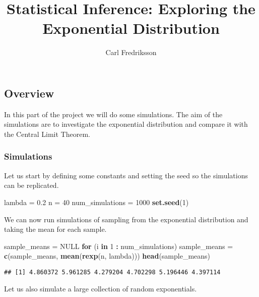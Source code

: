 \documentclass[]{article}
\title{Statistical Inference: Exploring the Exponential Distribution}
\author{Carl Fredriksson}
\date{}
\newenvironment{Shaded}{\begin{snugshade}}{\end{snugshade}}
\newcommand{\KeywordTok}[1]{\textcolor[rgb]{0.13,0.29,0.53}{\textbf{#1}}}
\newcommand{\DecValTok}[1]{\textcolor[rgb]{0.00,0.00,0.81}{#1}}
\newcommand{\FloatTok}[1]{\textcolor[rgb]{0.00,0.00,0.81}{#1}}
\newcommand{\StringTok}[1]{\textcolor[rgb]{0.31,0.60,0.02}{#1}}
\newcommand{\OtherTok}[1]{\textcolor[rgb]{0.56,0.35,0.01}{#1}}
\newcommand{\ControlFlowTok}[1]{\textcolor[rgb]{0.13,0.29,0.53}{\textbf{#1}}}
\newcommand{\OperatorTok}[1]{\textcolor[rgb]{0.81,0.36,0.00}{\textbf{#1}}}
\newcommand{\NormalTok}[1]{#1}
\begin{document}
\maketitle

\subsection{Overview}\label{overview}

In this part of the project we will do some simulations. The aim of the
simulations are to investigate the exponential distribution and compare
it with the Central Limit Theorem.

\subsubsection{Simulations}\label{simulations}

Let us start by defining some constants and setting the seed so the
simulations can be replicated.

\begin{Shaded}
\begin{Highlighting}[]
\NormalTok{lambda =}\StringTok{ }\FloatTok{0.2}
\NormalTok{n =}\StringTok{ }\DecValTok{40}
\NormalTok{num_simulations =}\StringTok{ }\DecValTok{1000}
\KeywordTok{set.seed}\NormalTok{(}\DecValTok{1}\NormalTok{)}
\end{Highlighting}
\end{Shaded}

We can now run simulations of sampling from the exponential distribution
and taking the mean for each sample.

\begin{Shaded}
\begin{Highlighting}[]
\NormalTok{sample_means =}\StringTok{ }\OtherTok{NULL}
\ControlFlowTok{for}\NormalTok{ (i }\ControlFlowTok{in} \DecValTok{1} \OperatorTok{:}\StringTok{ }\NormalTok{num_simulations) sample_means =}\StringTok{ }\KeywordTok{c}\NormalTok{(sample_means, }\KeywordTok{mean}\NormalTok{(}\KeywordTok{rexp}\NormalTok{(n, lambda)))}
\KeywordTok{head}\NormalTok{(sample_means)}
\end{Highlighting}
\end{Shaded}

\begin{verbatim}
## [1] 4.860372 5.961285 4.279204 4.702298 5.196446 4.397114
\end{verbatim}

Let us also simulate a large collection of random exponentials.
\end{document}
